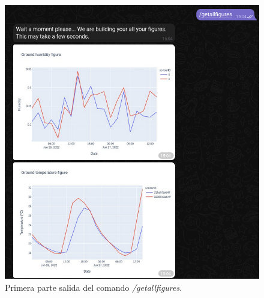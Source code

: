 \documentclass[a4paper, 12pt, oneside]{book}
\begin{document}
\begin{figure}[H]
  \centering
  \begin{minipage}[b]{0.4\textwidth}
    \includegraphics[width=\textwidth]{img/getallfiguresp1}
    \caption{Primera parte salida del comando \textit{/getallfigures}.}
    \label{figura:getallfiguresp1}
  \end{minipage}
  \hfill
  \begin{minipage}[b]{0.4\textwidth}

\end{minipage}
\end{figure}
\end{document}
